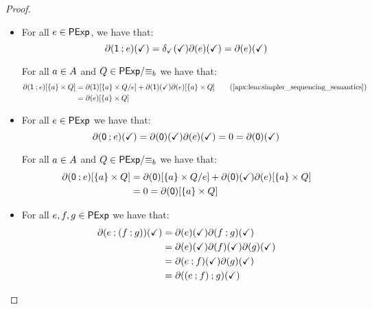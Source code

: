 \begin{proof}
\begin{itemize}
        \item[] 
        For all $e \in \mathsf{PExp}$, we have that:
        $$\partial(\mathsf{1} \mathbin{;} e)(\checkmark) = \delta_{\checkmark}(\checkmark)\partial(e)(\checkmark)=\partial(e)(\checkmark)$$

        For all $a \in {A}$ and $Q \in {\mathsf{PExp}}/{\equiv_b}$ we have that:
        \begin{align*}
            \partial(\one \seq e)[\{a\} \times Q] &= \partial(\one)[\{a\} \times {Q}/{e}] + \partial(\one)(\checkmark)\partial(e)[\{a\} \times Q] \tag{\Cref{apx:lem:simpler_sequencing_semantics}}\\
            &= \partial(e)[\{a\} \times {Q}]
        \end{align*}

        \item[] 
        For all $e \in \mathsf{PExp}$ we have that: 
        $$\partial(\mathsf{0} \mathbin{;} e)(\checkmark) = \partial(\mathsf{0})(\checkmark)\partial(e)(\checkmark) = 0 = \partial(\mathsf{0})(\checkmark)$$
        
        For all $a \in {A}$ and $Q \in {\mathsf{PExp}}/{\equiv_b}$ we have that:
        \begin{align*}
            \partial(\mathsf{0} \mathbin{;} e)[\{a\} \times Q] &= \partial(\mathsf{0})[\{a\} \times Q/{e}] + \partial(\mathsf{0})(\checkmark)\partial(e)[\{a\}\times Q]\\
            &=0=\partial(\mathsf{0})[\{a\} \times Q]
        \end{align*}

        \item[] 
        For all $e,f,g \in \mathsf{PExp}$ we have that:
        \begin{align*}
            \partial(e \mathbin{;} (f \mathbin{;} g))(\checkmark) &= \partial(e)(\checkmark)\partial(f \mathbin{;} g)(\checkmark)\\
            &=\partial(e)(\checkmark)\partial(f)(\checkmark)\partial(g)(\checkmark)\\
            &=\partial(e \mathbin{;} f)(\checkmark)\partial(g)(\checkmark)\\
            &=\partial((e \mathbin{;} f) \mathbin{;} g)(\checkmark)
        \end{align*}


\end{itemize}
\end{proof}
